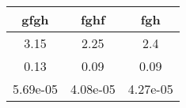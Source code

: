 \begin{center}
\begin{tabular}{|c|c|c|}
\hline
gfgh & fghf & fgh \\
\hline
3.15 & 2.25 & 2.4 \\
\hline
0.13 & 0.09 & 0.09 \\
\hline
5.69e-05 & 4.08e-05 & 4.27e-05 \\
\hline
\end{tabular}
\end{center}